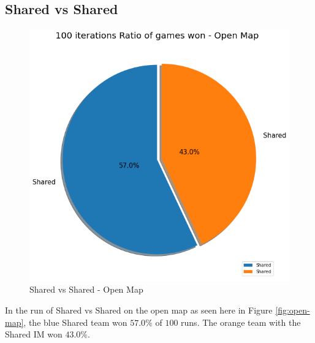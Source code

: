 \documentclass[]{report}
\begin{document}
		\subsection{Shared vs Shared}
		\begin{figure}[h!]
			\centering
			\includegraphics[width=0.9\linewidth]{"Images/100 Games Shared vs Shared Open Map"}
			\caption[Shared vs Shared - Open Map]{Shared vs Shared - Open Map}
			\label{fig:100-games-shared-vs-shared-open-map}
		\end{figure}
		In the run of Shared vs Shared on the open map as seen here in Figure \ref{fig:open-map}, the blue Shared team won $57.0\%$ of $100$ runs. The orange team with the Shared \ac{IM} won $43.0\%$.
		
		\clearpage
\end{document}
